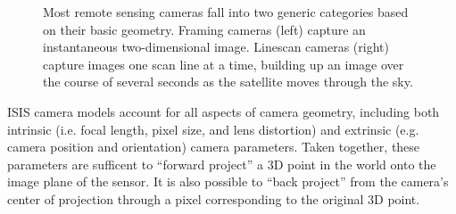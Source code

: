 \begin{figure}[h]
\centering
\caption{Most remote sensing cameras fall into two generic categories
  based on their basic geometry.  Framing cameras (left) capture an
  instantaneous two-dimensional image.  Linescan cameras (right)
  capture images one scan line at a time, building up an image over
  the course of several seconds as the satellite moves through the
  sky.}
\label{fig:camera_models}
\end{figure}

ISIS camera models account for all aspects of camera geometry,
including both intrinsic (i.e. focal length, pixel size, and lens
distortion) and extrinsic (e.g. camera position and orientation)
camera parameters.  Taken together, these parameters are sufficent to
``forward project'' a 3D point in the world onto the image plane of
the sensor.  It is also possible to ``back project'' from the camera's
center of projection through a pixel corresponding to the original 3D
point.

